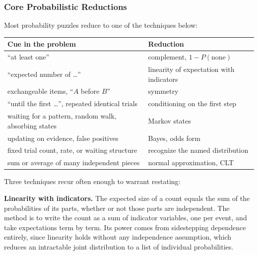 \subsubsection{Core Probabilistic Reductions}

Most probability puzzles reduce to one of the techniques below:

\vspace{1ex}

\begin{keybox}
\begin{center}
\small
\setlength{\tabcolsep}{5pt}
\begin{tabular}{@{}ll@{}}
\toprule
\textbf{Cue in the problem} & \textbf{Reduction} \\
\midrule
``at least one'' & complement, $1 - P(\text{none})$ \\
``expected number of \dots'' & linearity of expectation with indicators \\
exchangeable items, ``$A$ before $B$'' & symmetry \\
``until the first \dots'', repeated identical trials & conditioning on the first step \\
waiting for a pattern, random walk, absorbing states & Markov states \\
updating on evidence, false positives & Bayes, odds form \\
fixed trial count, rate, or waiting structure & recognize the named distribution \\
sum or average of many independent pieces & normal approximation, CLT \\
\bottomrule
\end{tabular}
\end{center}
\end{keybox}

Three techniques recur often enough to warrant restating:

\textbf{Linearity with indicators.} The expected size of a count equals the sum of the probabilities of its parts, whether or not those parts are independent. The method is to write the count as a sum of indicator variables, one per event, and take expectations term by term. Its power comes from sidestepping dependence entirely, since linearity holds without any independence assumption, which reduces an intractable joint distribution to a list of individual probabilities.

